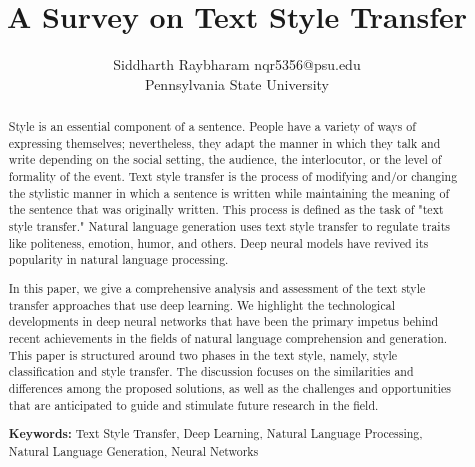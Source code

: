 \documentclass[akbc,twoside,11pt]{article}
\begin{document}
\title{A Survey on Text Style Transfer}


\author{\name Siddharth Raybharam \email nqr5356@psu.edu \\
        \addr Pennsylvania State University
       }

\maketitle
\begin{abstract}
Style is an essential component of a sentence. People have a variety of ways of expressing themselves; nevertheless, they adapt the manner in which they talk and write depending on the social setting, the audience, the interlocutor, or the level of formality of the event. Text style transfer is the process of modifying and/or changing the stylistic manner in which a sentence is written while maintaining the meaning of the sentence that was originally written. This process is defined as the task of "text style transfer." Natural language generation uses text style transfer to regulate traits like politeness, emotion, humor, and others. Deep neural models have revived its popularity in natural language processing.

In this paper, we give a comprehensive analysis and assessment of the text style transfer approaches that use deep learning. We highlight the technological developments in deep neural networks that have been the primary impetus behind recent achievements in the fields of natural language comprehension and generation. This paper is structured around two phases in the text style, namely, style classification and style transfer. The discussion focuses on the similarities and differences among the proposed solutions, as well as the challenges and opportunities that are anticipated to guide and stimulate future research in the field.

\noindent\textbf{Keywords: }Text Style Transfer, Deep Learning, Natural Language Processing, Natural Language Generation, Neural Networks
    
\end{abstract}
\end{document}
